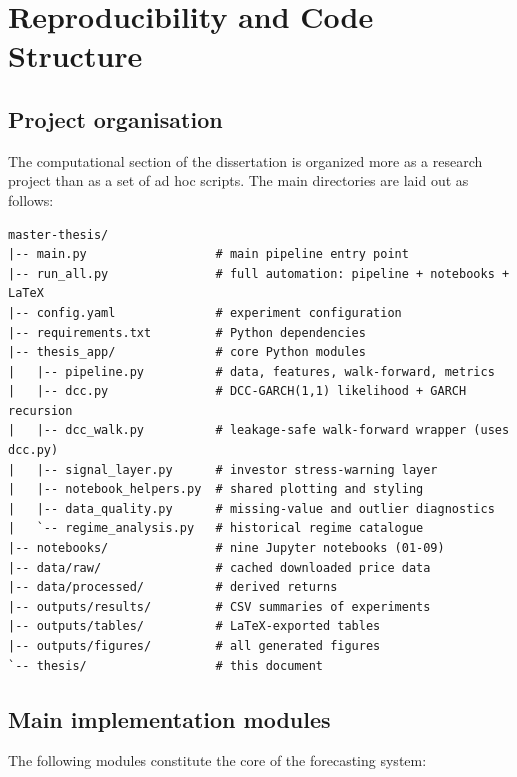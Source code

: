 \section{Reproducibility and Code Structure}
\label{app:reproducibility}

\subsection{Project organisation}

The computational section of the dissertation is organized more as a research project than as a set of ad hoc scripts. The main directories are laid out as follows:

\begin{lstlisting}[language={}, caption={Top-level project directory structure.}, label=lst:dirstructure]
master-thesis/
|-- main.py                  # main pipeline entry point
|-- run_all.py               # full automation: pipeline + notebooks + LaTeX
|-- config.yaml              # experiment configuration
|-- requirements.txt         # Python dependencies
|-- thesis_app/              # core Python modules
|   |-- pipeline.py          # data, features, walk-forward, metrics
|   |-- dcc.py               # DCC-GARCH(1,1) likelihood + GARCH recursion
|   |-- dcc_walk.py          # leakage-safe walk-forward wrapper (uses dcc.py)
|   |-- signal_layer.py      # investor stress-warning layer
|   |-- notebook_helpers.py  # shared plotting and styling
|   |-- data_quality.py      # missing-value and outlier diagnostics
|   `-- regime_analysis.py   # historical regime catalogue
|-- notebooks/               # nine Jupyter notebooks (01-09)
|-- data/raw/                # cached downloaded price data
|-- data/processed/          # derived returns
|-- outputs/results/         # CSV summaries of experiments
|-- outputs/tables/          # LaTeX-exported tables
|-- outputs/figures/         # all generated figures
`-- thesis/                  # this document
\end{lstlisting}

\subsection{Main implementation modules}

The following modules constitute the core of the forecasting system:

